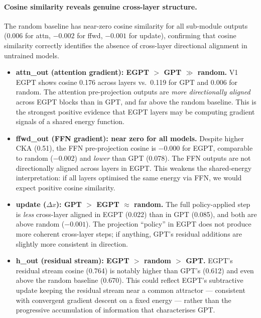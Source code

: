 \documentclass[11pt,a4paper]{article}
\begin{document}
\paragraph{Cosine similarity reveals genuine cross-layer structure.}
The random baseline has near-zero cosine similarity for all sub-module outputs
(0.006 for attn, $-0.002$ for ffwd, $-0.001$ for update), confirming that
cosine similarity correctly identifies the absence of cross-layer directional alignment
in untrained models.

\begin{itemize}
  \item \textbf{attn\_out (attention gradient): EGPT $>$ GPT $\gg$ random.}
    V1 EGPT shows cosine 0.176 across layers vs.\ 0.119 for GPT and 0.006 for random.
    The attention pre-projection outputs are \emph{more directionally aligned} across
    EGPT blocks than in GPT, and far above the random baseline.
    This is the strongest positive evidence that EGPT layers may be computing
    gradient signals of a shared energy function.

  \item \textbf{ffwd\_out (FFN gradient): near zero for all models.}
    Despite higher CKA (0.51), the FFN pre-projection cosine is $-0.000$ for EGPT,
    comparable to random ($-0.002$) and \emph{lower} than GPT (0.078).
    The FFN outputs are not directionally aligned across layers in EGPT.
    This weakens the shared-energy interpretation: if all layers optimised the same
    energy via FFN, we would expect positive cosine similarity.

  \item \textbf{update ($\Delta x$): GPT $>$ EGPT $\approx$ random.}
    The full policy-applied step is \emph{less} cross-layer aligned in EGPT (0.022)
    than in GPT (0.085), and both are above random ($-0.001$).
    The projection ``policy'' in EGPT does not produce more coherent cross-layer steps;
    if anything, GPT's residual additions are slightly more consistent in direction.

  \item \textbf{h\_out (residual stream): EGPT $>$ random $>$ GPT.}
    EGPT's residual stream cosine (0.764) is notably higher than GPT's (0.612) and
    even above the random baseline (0.670).
    This could reflect EGPT's subtractive update keeping the residual stream near a
    common attractor --- consistent with convergent gradient descent on a fixed energy ---
    rather than the progressive accumulation of information that characterises GPT.
\end{itemize}
\end{document}
